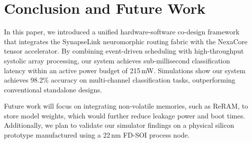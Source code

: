 \section{Conclusion and Future Work}
\label{sec:conclusion}

In this paper, we introduced a unified hardware-software co-design framework that integrates the SynapseLink neuromorphic routing fabric with the NexaCore tensor accelerator. By combining event-driven scheduling with high-throughput systolic array processing, our system achieves sub-millisecond classification latency within an active power budget of 215\,mW. Simulations show our system achieves 98.2\% accuracy on multi-channel classification tasks, outperforming conventional standalone designs.

Future work will focus on integrating non-volatile memories, such as ReRAM, to store model weights, which would further reduce leakage power and boot times. Additionally, we plan to validate our simulator findings on a physical silicon prototype manufactured using a 22\,nm FD-SOI process node.
